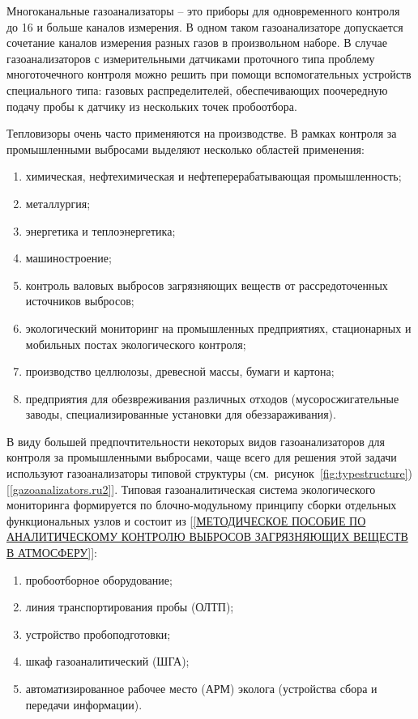 \documentclass[14pt, a4paper]{extreport}
\begin{document}
	Многоканальные газоанализаторы -- это приборы для одновременного контроля до 16 и больше каналов измерения. В одном таком газоанализаторе допускается сочетание каналов измерения разных газов в произвольном наборе. В случае газоанализаторов с измерительными датчиками проточного типа проблему многоточечного контроля можно решить при помощи вспомогательных устройств специального типа: газовых распределителей, обеспечивающих поочередную подачу пробы к датчику из нескольких точек пробоотбора. 
	
	Тепловизоры очень часто применяются на производстве. В рамках контроля за промышленными выбросами выделяют несколько областей применения:
	\begin{enumerate}[label={\arabic*)}]
		\item химическая, нефтехимическая и нефтеперерабатывающая промышленность;
		\item металлургия;
		\item энергетика и теплоэнергетика;
		\item машиностроение;
		\item контроль валовых выбросов загрязняющих веществ от рассредоточенных источников выбросов;
		\item экологический мониторинг на промышленных предприятиях, стационарных и мобильных постах экологического контроля;
		\item производство целлюлозы, древесной массы, бумаги и картона;
		\item предприятия для обезвреживания различных отходов (мусоросжигательные заводы, специализированные установки для обеззараживания).
	\end{enumerate}
	
	В виду большей предпочтительности некоторых видов газоанализаторов для контроля за промышленными выбросами, чаще всего для решения этой задачи используют газоанализаторы типовой структуры (см.~рисунок~\ref{fig:typestructure}) [\ref{gazoanalizators.ru2}]. Типовая газоаналитическая система экологического мониторинга формируется по блочно-модульному принципу сборки отдельных функциональных узлов и состоит из [\ref{МЕТОДИЧЕСКОЕ ПОСОБИЕ ПО АНАЛИТИЧЕСКОМУ КОНТРОЛЮ ВЫБРОСОВ ЗАГРЯЗНЯЮЩИХ ВЕЩЕСТВ В АТМОСФЕРУ}]:
	\begin{enumerate}[label={\arabic*)}]
		\item пробоотборное оборудование;
		\item линия транспортирования пробы (ОЛТП);
		\item устройство пробоподготовки;
		\item шкаф газоаналитический (ШГА);
		\item автоматизированное рабочее место (АРМ) эколога (устройства сбора и передачи информации).
	\end{enumerate}
	
\end{document}
